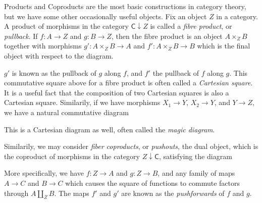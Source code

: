 Products and Coproducts are the most basic constructions in category theory, but we have some other occasionally useful objects. Fix an object $Z$ in a category. A product of morphisms in the category $\mathsf{C} \downarrow Z$ is called a \emph{fibre product}, or \emph{pullback}. If $f: A \to Z$ and $g: B \to Z$, then the fibre product is an object $A \times_Z B$ together with morphisms $g': A \times_Z B \to A$ and $f': A \times_Z B \to B$ which is the final object  with respect to the diagram.
%
\begin{center}
\end{center}
%
$g'$ is known as the pullback of $g$ along $f$, and $f'$ the pullback of $f$ along $g$. This commutative square above for a fibre product is often called a \emph{Cartesian square}. It is a useful fact that the composition of two Cartesian squares is also a Cartesian square. Similarily, if we have morphisms $X_1 \to Y$, $X_2 \to Y$, and $Y \to Z$, we have a natural commutative diagram
%
\begin{center}
\end{center}
%
This is a Cartesian diagram as well, often called the \emph{magic diagram}.

Similarily, we may consider \emph{fiber coproducts}, or \emph{pushouts}, the dual object, which is the coproduct of morphisms in the category $Z \downarrow \mathsf{C}$, satisfying the diagram
%
\begin{center}
\end{center}
%
More specifically, we have $f: Z \to A$ and $g: Z \to B$, and any family of maps $A \to C$ and $B \to C$ which causes the square of functions to commute factors through $A \coprod_Z B$. The maps $f'$ and $g'$ are known as the \emph{pushforwards} of $f$ and $g$.

